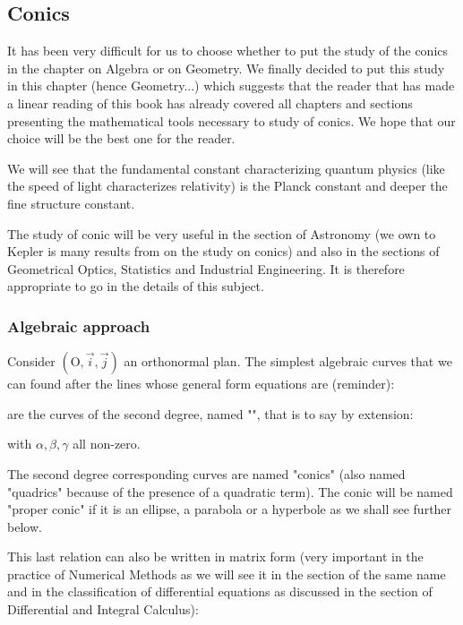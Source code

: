 	\subsection{Conics}

	It has been very difficult for us to choose whether to put the study of the conics in the chapter on Algebra or on Geometry. We finally decided to put this study in this chapter (hence Geometry...) which suggests that the reader that has made a linear reading of this book has already covered all chapters and sections presenting the mathematical tools necessary to study of conics. We hope that our choice will be the best one for the reader.

	\begin{tcolorbox}[title=Remark,colframe=black,arc=10pt]
	We will see that the fundamental constant characterizing quantum physics (like the speed of light characterizes relativity) is the Planck constant and deeper the fine structure constant.
	\end{tcolorbox}	
	
	The study of conic will be very useful in the section of Astronomy (we own to Kepler is  many results from on the study on conics) and also in the sections of Geometrical Optics, Statistics and Industrial Engineering. It is therefore appropriate to go in the details of this subject.

	\subsubsection{Algebraic approach}

	Consider $(\text{O},\vec{i},\vec{j})$ an orthonormal plan. The simplest algebraic curves that we can found after the lines whose general form equations are (reminder):
	
are the curves of the second degree, named "", that is to say by extension:
	
with $\alpha,\beta,\gamma$ all non-zero.

The second degree corresponding curves are named "conics" (also named "quadrics" because of the presence of a quadratic term). The conic will be named "proper conic" if it is an ellipse, a parabola or a hyperbole as we shall see further below.

This last relation can also be written in matrix form (very important in the practice of Numerical Methods as we will see it in the section of the same name and in the classification of differential equations as discussed in the section of Differential and Integral Calculus):
	
